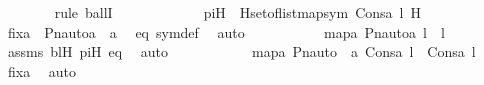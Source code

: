 \begin{isabellebody}
\ \ \ \ \ \ \isamarkupfalse%
\ {\isacharparenleft}{\kern0pt}rule\ ballI{\isacharparenright}{\kern0pt}\isanewline
\ \ \ \ \ \ \ \ \isamarkupfalse%
\ {\isasympi}\ \isamarkupfalse%
\ piH\ {\isacharcolon}{\kern0pt}\ {\isachardoublequoteopen}{\isasympi}{\isasymin}{\isacharparenleft}{\kern0pt}{\isasymInter}H{\isasymin}set{\isacharunderscore}{\kern0pt}of{\isacharunderscore}{\kern0pt}list{\isacharparenleft}{\kern0pt}map{\isacharparenleft}{\kern0pt}sym{\isacharcomma}{\kern0pt}\ Cons{\isacharparenleft}{\kern0pt}a{\isacharcomma}{\kern0pt}\ l{\isacharparenright}{\kern0pt}{\isacharparenright}{\kern0pt}{\isacharparenright}{\kern0pt}{\isachardot}{\kern0pt}\ H{\isacharparenright}{\kern0pt}{\isachardoublequoteclose}\isanewline
\ \ \ \ \ \ \ \ \isamarkupfalse%
\ \isamarkupfalse%
\ fixa\ {\isacharcolon}{\kern0pt}\ {\isachardoublequoteopen}Pn{\isacharunderscore}{\kern0pt}auto{\isacharparenleft}{\kern0pt}{\isasympi}{\isacharparenright}{\kern0pt}{\isacharbackquote}{\kern0pt}a\ {\isacharequal}{\kern0pt}\ a{\isachardoublequoteclose}\ \isamarkupfalse%
\ eq\ sym{\isacharunderscore}{\kern0pt}def\ \isamarkupfalse%
\ auto\ \isanewline
\ \ \ \ \ \ \ \ \isamarkupfalse%
\ {\isachardoublequoteopen}map{\isacharparenleft}{\kern0pt}{\isasymlambda}a{\isachardot}{\kern0pt}\ Pn{\isacharunderscore}{\kern0pt}auto{\isacharparenleft}{\kern0pt}{\isasympi}{\isacharparenright}{\kern0pt}{\isacharbackquote}{\kern0pt}a{\isacharcomma}{\kern0pt}\ l{\isacharparenright}{\kern0pt}\ {\isacharequal}{\kern0pt}\ l{\isachardoublequoteclose}\ \isamarkupfalse%
\ assms\ bl{\isacharprime}{\kern0pt}H\ piH\ eq\ \isamarkupfalse%
\ auto\isanewline
\ \ \ \ \ \ \ \ \isamarkupfalse%
\ \isamarkupfalse%
\ {\isachardoublequoteopen}map{\isacharparenleft}{\kern0pt}{\isasymlambda}a{\isachardot}{\kern0pt}\ Pn{\isacharunderscore}{\kern0pt}auto{\isacharparenleft}{\kern0pt}{\isasympi}{\isacharparenright}{\kern0pt}\ {\isacharbackquote}{\kern0pt}\ a{\isacharcomma}{\kern0pt}\ Cons{\isacharparenleft}{\kern0pt}a{\isacharcomma}{\kern0pt}\ l{\isacharparenright}{\kern0pt}{\isacharparenright}{\kern0pt}\ {\isacharequal}{\kern0pt}\ Cons{\isacharparenleft}{\kern0pt}a{\isacharcomma}{\kern0pt}\ l{\isacharparenright}{\kern0pt}{\isachardoublequoteclose}\ \isamarkupfalse%
\ fixa\ \isamarkupfalse%
\ auto\isanewline
\ \ \ \ \ \ \isamarkupfalse%
\isanewline
\ \ \ \ \ \ \isamarkupfalse%
\ \isamarkupfalse%

\end{isabellebody}
